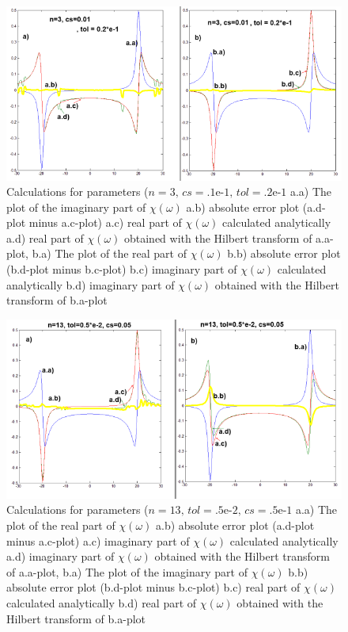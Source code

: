 \documentclass[12pt,twoside,a4paper]{article}
\numberwithin{equation}{subsection}
\numberwithin{figure}{subsection}
\begin{document}
\begin{figure}
  \includegraphics[width=150mm]{img/nc_lin2.png}
  \caption{
     Calculations for parameters ($n=3, \,cs=\mbox{.1e-1}, \,tol=\mbox{.2e-1}$
     a.a) The plot of the imaginary part of $\chi (\omega )$
     a.b) absolute error plot (a.d-plot minus a.c-plot) 
     a.c) real part of $\chi (\omega )$ calculated analytically 
     a.d) real part of $\chi (\omega )$ obtained with the Hilbert transform of a.a-plot, 
     b.a) The plot of the real part of $\chi (\omega )$
     b.b) absolute error plot (b.d-plot minus b.c-plot)
     b.c) imaginary part of $\chi (\omega )$ calculated analytically 
     b.d) imaginary part of $\chi (\omega )$ obtained with the Hilbert transform of b.a-plot
     \label{fig:nc_lin2} 
  }
\end{figure}  

\begin{figure}
  \includegraphics[width=150mm]{img/nc_lin3.png}
  \caption{
    Calculations for parameters ($n=13, \,tol=\mbox{.5e-2}, \,cs=\mbox{.5e-1}$
    a.a) The plot of the real part of $\chi (\omega )$
    a.b) absolute error plot (a.d-plot minus a.c-plot) 
    a.c) imaginary part of $\chi (\omega )$ calculated analytically 
    a.d) imaginary part of $\chi (\omega )$ obtained with the Hilbert transform of a.a-plot, 
    b.a) The plot of the imaginary part of $\chi (\omega )$
    b.b) absolute error plot (b.d-plot minus b.c-plot) 
    b.c) real part of $\chi (\omega )$ calculated analytically 
    b.d) real part of $\chi (\omega )$ obtained with the Hilbert transform of b.a-plot
    \label{fig:nc_lin3}     
  }
\end{figure}
\end{document}
